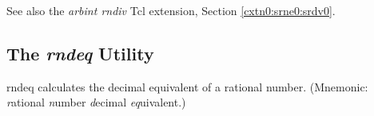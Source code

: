 \begin{dosutilcommandseealso}
See also the \emph{arbint rndiv} Tcl extension, 
Section \ref{cxtn0:srne0:srdv0}.
\end{dosutilcommandseealso}


\subsection{The \emph{rndeq} Utility}
\label{cdcm0:srnu0:srnq0}

\begin{dosutilcommandname}{rndeq}%
calculates the decimal equivalent of a rational number.
(Mnemonic:  \emph{r}ational \emph{n}umber
\emph{d}ecimal \emph{eq}uivalent.)
\end{dosutilcommandname}

\begin{dosutilcommandsynopsis}
\end{dosutilcommandsynopsis}

